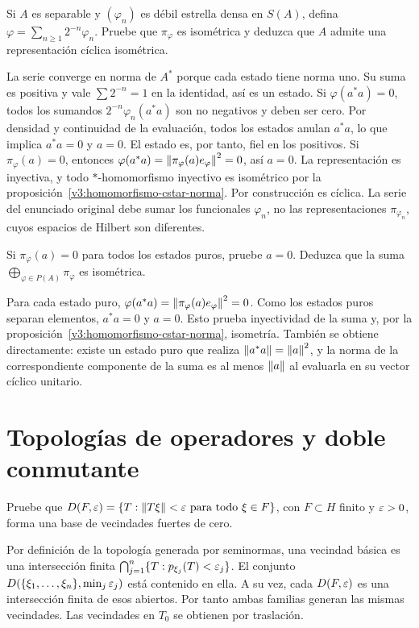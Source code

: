 \begin{ejercicio}\label{ej:v3-l30-2}
Si $A$ es separable y $(\varphi_n)$ es débil estrella densa en $S(A)$, defina $\varphi=\sum_{n\ge1}2^{-n}\varphi_n$. Pruebe que $\pi_\varphi$ es isométrica y deduzca que $A$ admite una representación cíclica isométrica.
\end{ejercicio}
\begin{solucion}
La serie converge en norma de $A^*$ porque cada estado tiene norma uno. Su suma es positiva y vale $\sum2^{-n}=1$ en la identidad, así es un estado. Si $\varphi(a^*a)=0$, todos los sumandos $2^{-n}\varphi_n(a^*a)$ son no negativos y deben ser cero. Por densidad y continuidad de la evaluación, todos los estados anulan $a^*a$, lo que implica $a^*a=0$ y $a=0$. El estado es, por tanto, fiel en los positivos. Si $\pi_\varphi(a)=0$, entonces $\varphi(a^*a)=\left\lVert\pi_\varphi(a)e_\varphi\right\rVert^2=0$, así $a=0$. La representación es inyectiva, y todo $*$-homomorfismo inyectivo es isométrico por la proposición~\ref{v3:homomorfismo-cstar-norma}. Por construcción es cíclica. La serie del enunciado original debe sumar los funcionales $\varphi_n$, no las representaciones $\pi_{\varphi_n}$, cuyos espacios de Hilbert son diferentes.
\end{solucion}

\begin{ejercicio}\label{ej:v3-l30-3}
Si $\pi_\varphi(a)=0$ para todos los estados puros, pruebe $a=0$. Deduzca que la suma $\bigoplus_{\varphi\in P(A)}\pi_\varphi$ es isométrica.
\end{ejercicio}
\begin{solucion}
Para cada estado puro, $\varphi(a^*a)=\left\lVert\pi_\varphi(a)e_\varphi\right\rVert^2=0$. Como los estados puros separan elementos, $a^*a=0$ y $a=0$. Esto prueba inyectividad de la suma y, por la proposición~\ref{v3:homomorfismo-cstar-norma}, isometría. También se obtiene directamente: existe un estado puro que realiza $\left\lVert a^*a\right\rVert=\left\lVert a\right\rVert^2$, y la norma de la correspondiente componente de la suma es al menos $\left\lVert a\right\rVert$ al evaluarla en su vector cíclico unitario.
\end{solucion}

\chapter{Topologías de operadores y doble conmutante}

\begin{ejercicio}\label{ej:v3-l31-1}
Pruebe que $D(F,\varepsilon)=\{T:\left\lVert T\xi\right\rVert<\varepsilon\text{ para todo }\xi\in F\}$, con $F\subset H$ finito y $\varepsilon>0$, forma una base de vecindades fuertes de cero.
\end{ejercicio}
\begin{solucion}
Por definición de la topología generada por seminormas, una vecindad básica es una intersección finita $\bigcap_{j=1}^n\{T:p_{\xi_j}(T)<\varepsilon_j\}$. El conjunto $D(\{\xi_1,\ldots,\xi_n\},\min_j\varepsilon_j)$ está contenido en ella. A su vez, cada $D(F,\varepsilon)$ es una intersección finita de esos abiertos. Por tanto ambas familias generan las mismas vecindades. Las vecindades en $T_0$ se obtienen por traslación.
\end{solucion}

